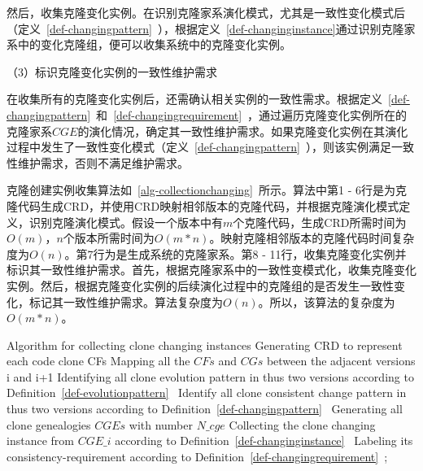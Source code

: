 然后，收集克隆变化实例。在识别克隆家系演化模式，尤其是一致性变化模式后（定义~\ref{def-changingpattern}~），根据定义~\ref{def-changinginstance}通过识别克隆家系中的变化克隆组，便可以收集系统中的克隆变化实例。

（3）标识克隆变化实例的一致性维护需求

在收集所有的克隆变化实例后，还需确认相关实例的一致性需求。根据定义~\ref{def-changingpattern}~和~\ref{def-changingrequirement}~，通过遍历克隆变化实例所在的克隆家系$CGE$的演化情况，确定其一致性维护需求。如果克隆变化实例在其演化过程中发生了一致性变化模式（定义~\ref{def-changingpattern}~），则该实例满足一致性维护需求，否则不满足维护需求。

克隆创建实例收集算法如~\ref{alg-collectionchanging}~所示。算法中第1 - 6行是为克隆代码生成CRD，并使用CRD映射相邻版本的克隆代码，并根据克隆演化模式定义，识别克隆演化模式。假设一个版本中有$m$个克隆代码，生成CRD所需时间为$O(m)$，$n$个版本所需时间为$O(m*n)$。映射克隆相邻版本的克隆代码时间复杂度为$O(n)$。第7行为是生成系统的克隆家系。第8 - 11行，收集克隆变化实例并标识其一致性维护需求。首先，根据克隆家系中的一致性变模式化，收集克隆变化实例。然后，根据克隆变化实例的后续演化过程中的克隆组的是否发生一致性变化，标记其一致性维护需求。算法复杂度为$O(n)$。所以，该算法的复杂度为$O(m*n)$。

\vspace{1em}
\begin{minipage}{0.8\textwidth}
\centering
\begin{algorithm}[H]
 {Algorithm for collecting clone changing instances}
\label{alg-collectionchanging}
{ 
 Generating CRD to represent each code clone {CFs}\;
 Mapping all the $CFs$ and $CGs$ between the adjacent versions {i} and {i+1}\;
 Identifying all clone evolution pattern in thus two versions according to Definition~\ref{def-evolutionpattern}~\;
 Identify all clone consistent change pattern in thus two versions according to Definition~\ref{def-changingpattern}~\;
}
Generating all clone genealogies $CGEs$ with number $N\_cge$\;
{ 
 Collecting the clone changing instance from $CGE\_i$ according to Definition~\ref{def-changinginstance}~\; 
 Labeling its consistency-requirement according to Definition~\ref{def-changingrequirement}~;
}
\end{algorithm}
\end{minipage}

